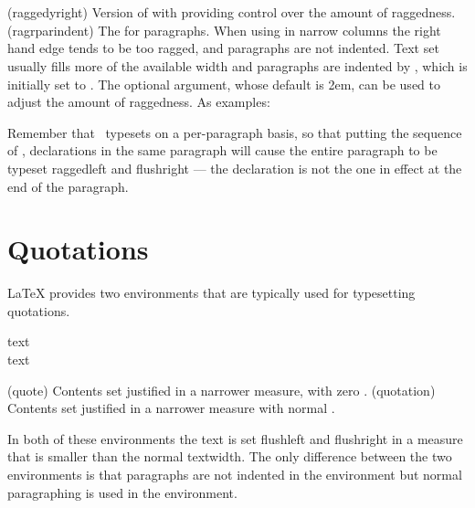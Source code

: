 \begin{syntax}
\cmd{\raggedyright} \\
\lnc{\ragrparindent} \\
\end{syntax}
\glossary(raggedyright)%
  {}%
  {Version of  with  providing control
   over the amount of raggedness.}
\glossary(ragrparindent)%
  {}%
  {The  for  paragraphs.}
When using \cmd{\raggedright} in narrow columns the right hand edge tends to
be too ragged, and paragraphs are not indented. 
Text set \cmd{\raggedyright} usually fills more of the available
width and paragraphs are indented by \lnc{\ragrparindent}, which is initially
set to \lnc{\parindent}. The optional  argument, whose default
is 2em, can be used to adjust the amount of raggedness. As examples:
\begin{lcode}
\raggedyright[0pt]   %
\raggedyright[1fil]  %
\raggedyright[0.5em] %
\end{lcode}

    Remember that \ltx\ typesets on a per-paragraph
 basis, so that putting
the sequence of \cmd{\centering}, \cmd{\raggedleft} declarations in the same
paragraph will cause the entire paragraph to be typeset 
raggedleft and 
flushright --- the \cmd{\centering} declaration is not the one in effect 
at the end of the paragraph.

\section{Quotations}

    LaTeX provides two environments that are typically used for typesetting
quotations.

\begin{syntax}
 text  \\
 text  \\
\end{syntax}
\glossary(quote)%
  {}%
  {Contents set justified in a narrower measure, with zero .}
\glossary(quotation)%
  {}%
  {Contents set justified in a narrower measure with normal .}

     In both of these environments the text is set flushleft and flushright
in a measure that is smaller than the normal textwidth. The only difference
between the two environments is that paragraphs 
are not indented in the 
environment but normal paragraphing is used in the  environment.


